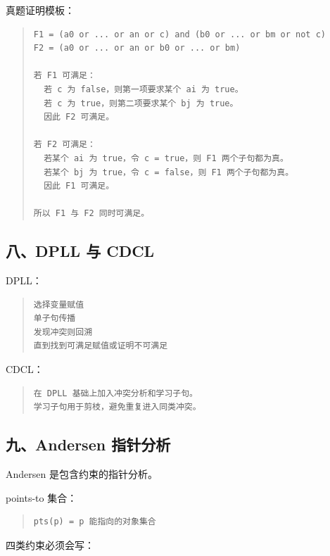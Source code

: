 \documentclass[UTF8,zihao=-4]{ctexart}
\begin{document}
真题证明模板：


\begin{quote}
\footnotesize
\begin{verbatim}
F1 = (a0 or ... or an or c) and (b0 or ... or bm or not c)
F2 = (a0 or ... or an or b0 or ... or bm)

若 F1 可满足：
  若 c 为 false，则第一项要求某个 ai 为 true。
  若 c 为 true，则第二项要求某个 bj 为 true。
  因此 F2 可满足。

若 F2 可满足：
  若某个 ai 为 true，令 c = true，则 F1 两个子句都为真。
  若某个 bj 为 true，令 c = false，则 F1 两个子句都为真。
  因此 F1 可满足。

所以 F1 与 F2 同时可满足。
\end{verbatim}
\end{quote}


\subsection{八、DPLL 与 CDCL}


DPLL：


\begin{quote}
\footnotesize
\begin{verbatim}
选择变量赋值
单子句传播
发现冲突则回溯
直到找到可满足赋值或证明不可满足
\end{verbatim}
\end{quote}


CDCL：


\begin{quote}
\footnotesize
\begin{verbatim}
在 DPLL 基础上加入冲突分析和学习子句。
学习子句用于剪枝，避免重复进入同类冲突。
\end{verbatim}
\end{quote}


\subsection{九、Andersen 指针分析}


Andersen 是包含约束的指针分析。


points-to 集合：


\begin{quote}
\footnotesize
\begin{verbatim}
pts(p) = p 能指向的对象集合
\end{verbatim}
\end{quote}


四类约束必须会写：
\end{document}
